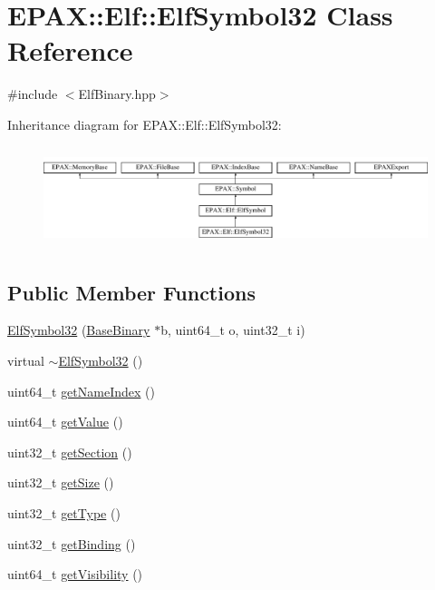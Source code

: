 \hypertarget{class_e_p_a_x_1_1_elf_1_1_elf_symbol32}{\section{\-E\-P\-A\-X\-:\-:\-Elf\-:\-:\-Elf\-Symbol32 \-Class \-Reference}
\label{class_e_p_a_x_1_1_elf_1_1_elf_symbol32}
}


{\ttfamily \#include $<$\-Elf\-Binary.\-hpp$>$}

\-Inheritance diagram for \-E\-P\-A\-X\-:\-:\-Elf\-:\-:\-Elf\-Symbol32\-:\begin{figure}[H]
\begin{center}
\leavevmode
\includegraphics[height=2.966887cm]{class_e_p_a_x_1_1_elf_1_1_elf_symbol32}
\end{center}
\end{figure}
\subsection*{\-Public \-Member \-Functions}
\begin{DoxyCompactItemize}
\item 
\hyperlink{class_e_p_a_x_1_1_elf_1_1_elf_symbol32_a5abc8b081298263bef61b466cbfac2d1}{\-Elf\-Symbol32} (\hyperlink{class_e_p_a_x_1_1_base_binary}{\-Base\-Binary} $\ast$b, uint64\-\_\-t o, uint32\-\_\-t i)
\item 
virtual \hyperlink{class_e_p_a_x_1_1_elf_1_1_elf_symbol32_a355036bd959ec61140192aac8a486750}{$\sim$\-Elf\-Symbol32} ()
\item 
uint64\-\_\-t \hyperlink{class_e_p_a_x_1_1_elf_1_1_elf_symbol32_a319c4e22fbb4b99667707a8b0d9412d1}{get\-Name\-Index} ()
\item 
uint64\-\_\-t \hyperlink{class_e_p_a_x_1_1_elf_1_1_elf_symbol32_a2b4bb23d3d59280ccbbdf0b239bc4ce2}{get\-Value} ()
\item 
uint32\-\_\-t \hyperlink{class_e_p_a_x_1_1_elf_1_1_elf_symbol32_a5ae0934c001dc2a81dbd88fb1d0ad786}{get\-Section} ()
\item 
uint32\-\_\-t \hyperlink{class_e_p_a_x_1_1_elf_1_1_elf_symbol32_ae5ef1d81c0a3d126441e147104f8ea85}{get\-Size} ()
\item 
uint32\-\_\-t \hyperlink{class_e_p_a_x_1_1_elf_1_1_elf_symbol32_a870365328bf8943618c3a3f907f26b24}{get\-Type} ()
\item 
uint32\-\_\-t \hyperlink{class_e_p_a_x_1_1_elf_1_1_elf_symbol32_a9361f33bf04cbfd6623392f1905aaef6}{get\-Binding} ()
\item 
uint64\-\_\-t \hyperlink{class_e_p_a_x_1_1_elf_1_1_elf_symbol32_a547bb437518ff680a5b35c36ebc5e39a}{get\-Visibility} ()
\end{DoxyCompactItemize}


